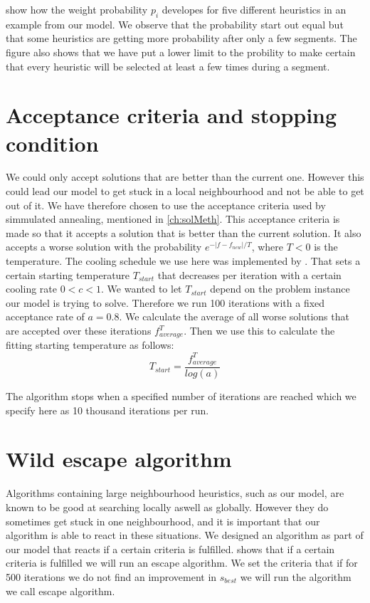 \documentclass[../main.tex]{subfiles}
\begin{document}
 show how the weight probability $p_i$ developes for five different heuristics in an example from our model. 
We observe that the probability start out equal but that some heuristics are getting more probability after only a few segments.
The figure also shows that we have put a lower limit to the probility to make certain that every heuristic will be selected at least a few times during a segment.

\section{Acceptance criteria and stopping condition}
\label{sec:accept}
We could only accept solutions that are better than the current one.
However this could lead our model to get stuck in a local neighbourhood and not be able to get out of it. 
We have therefore chosen to use the acceptance criteria used by simmulated annealing, mentioned in \cref{ch:solMeth}. 
This acceptance criteria is made so that it accepts a solution that is better than the current solution. It also accepts a worse solution with the probability $e^{-|f-f_{new}|/T}$, where $T<0$ is the temperature. 
The cooling schedule we use here was implemented by \cite{crama03}. That sets a certain starting temperature $T_{start}$ that decreases per iteration with a certain cooling rate $0<c<1$.
We wanted to let $T_{start}$ depend on the problem instance our model is trying to solve. Therefore we run 100 iterations with a fixed acceptance rate of $a = 0.8$. 
We calculate the average of all worse solutions that are accepted over these iterations $f^T_{average}$.  
Then we use this to calculate the fitting starting temperature as follows:
\begin{equation}\label{eq:startTemp}
    T_{start} = \dfrac{f^T_{average}}{log(a)}
\end{equation}

The algorithm stops when a specified number of iterations are reached which we specify here as 10 thousand iterations per run.

\section{Wild escape algorithm}
\label{sec:wild}
Algorithms containing large neighbourhood heuristics, such as our model, are known to be good at searching locally aswell as globally. 
However they do sometimes get stuck in one neighbourhood, and it is important that our algorithm is able to react in these situations.
We designed an algorithm as part of our model that reacts if a certain criteria is fulfilled.  shows that if a certain criteria is fulfilled we will run an escape algorithm.
We set the criteria that if for 500 iterations we do not find an improvement in $s_{best}$ we will run the algorithm we call escape algorithm. 
\end{document}
